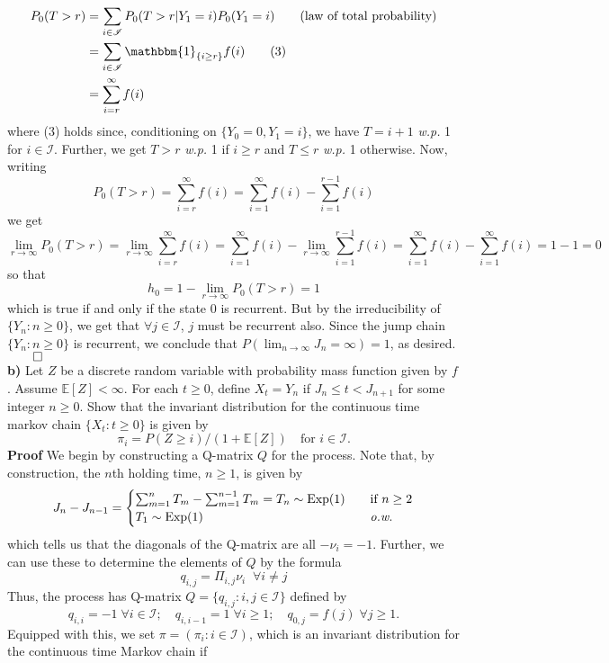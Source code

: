 \documentclass[11pt, letterpaper]{article}
\newcommand{\mbb}[1]{\mathbb{#1}}
\newcommand{\mc}[1]{\mathcal{#1}}
\begin{document}
    \begin{align*}
        P_0(T>r)&=\sum_{i\in\mc{I}}P_0(T>r|Y_1=i)P_0(Y_1=i)\tag{law of total probability}\\
        &=\sum_{i\in\mc{I}}\mathbbm{1}_{\{i\geq r\}}f(i)\tag{3}\\
        &=\sum_{i=r}^\infty f(i)
    \end{align*}
    where (3) holds since, conditioning on $\{Y_0=0,Y_1=i\}$, we have $T=i+1$ {\it w.p.} 1 for $i\in\mc{I}$. Further, we get $T>r$ {\it w.p.} 1 if $i\geq r$ and $T\leq r$ {\it w.p.} 1 otherwise. Now, writing
    \[P_0(T>r)=\sum_{i=r}^\infty f(i)=\sum_{i=1}^\infty f(i) - \sum_{i=1}^{r-1}f(i)\]
    we get
    \[\lim_{r\rightarrow\infty}P_0(T>r)=\lim_{r\rightarrow\infty}\sum_{i=r}^\infty f(i)=\sum_{i=1}^\infty f(i)-\lim_{r\rightarrow\infty}\sum_{i=1}^{r-1}f(i)=\sum_{i=1}^\infty f(i)-\sum_{i=1}^\infty f(i)=1-1=0\]
    so that
    \[h_0=1-\lim_{r\rightarrow\infty}P_0(T>r)=1\]
    which is true if and only if the state $0$ is recurrent. But by the irreducibility of $\{Y_n:n\geq 0\}$, we get that $\forall j\in\mc{I}$, $j$ must be recurrent also. Since the jump chain $\{Y_n:n\geq 0\}$ is recurrent, we conclude that $P(\lim_{n\rightarrow\infty}J_n=\infty)=1$, as desired.\hfill{$\qed$}\\[10pt]
    {\bf b)} Let $Z$ be a discrete random variable with probability mass function given by $f$. Assume $\mbb{E}[Z]<\infty$. For each $t\geq 0$, define $X_t=Y_n$ if $J_n\leq t<J_{n+1}$ for some integer $n\geq 0$.
    Show that the invariant distribution for the continuous time markov chain $\{X_t:t\geq 0\}$ is given by
    \[\pi_i=P(Z\geq i)/(1+\mbb{E}[Z])\quad\text{for $i\in\mc{I}$}.\]
    {\bf Proof} We begin by constructing a Q-matrix $Q$ for the process. Note that, by construction, the $n$th holding time, $n\geq 1$, is given by
    \[J_{n}-J_{n-1}=\begin{cases}
        \sum_{m=1}^{n}T_m-\sum_{m=1}^{n-1}T_m=T_{n}\sim\text{Exp}(1)\quad&\text{if $n\geq 2$}\\
        T_1\sim\text{Exp}(1)\quad&\text{{\it o.w.}}
    \end{cases}\]
    which tells us that the diagonals of the Q-matrix are all $-\nu_i=-1$. Further, we can use these to determine the elements of $Q$ by the formula
    \[q_{i,j}=\Pi_{i,j}\nu_i\;\;\forall i\neq j\]
    Thus, the process has Q-matrix $Q=\{q_{i,j}:i,j\in\mc{I}\}$ defined by
    \[q_{i,i}=-1\;\forall i\in\mc{I};\quad q_{i,i-1}=1\;\forall i\geq 1;\quad q_{0,j}=f(j)\;\forall j\geq 1.\]
    Equipped with this, we set $\pi=(\pi_i:i\in\mc{I})$, which is an invariant distribution for the continuous time Markov chain if
\end{document}
